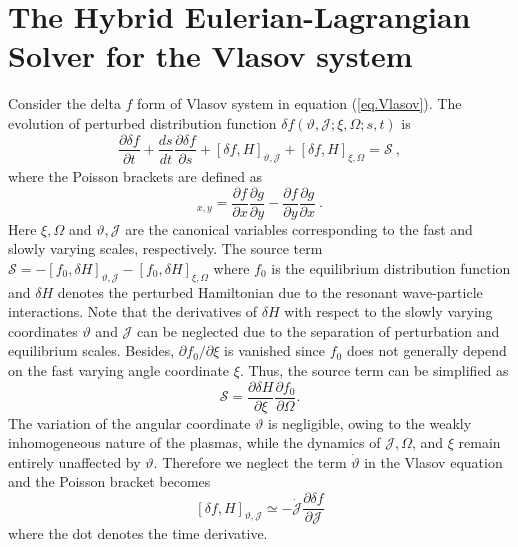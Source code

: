 \section{The Hybrid Eulerian-Lagrangian Solver for the Vlasov system}
\label{sec:vlasov}
Consider the  delta $f$ form of Vlasov system in equation (\ref{eq.Vlasov}). The evolution of  perturbed distribution function $\delta f(\vartheta,\mathcal{J};\xi,\Omega;s,t)$ is
\begin{equation}\label{eq.deltaf}
    \frac{\partial \delta f}{\partial t}+ \frac{d s_{}}{d t} \frac{\partial \delta f}{\partial s_{}} + \left[\delta f, H\right]_{\vartheta,\mathcal{J}} +  \left[\delta f, H\right]_{\xi,\Omega} = \mathcal{S}~,
\end{equation}
where the   Poisson brackets are defined as
\begin{equation}
    [f,~g]_{x,y} = \frac{\partial f}{\partial x}\frac{\partial g}{\partial y}-\frac{\partial f}{\partial y}\frac{\partial g}{\partial x}~.
\end{equation}
Here $\xi,\Omega$ and $\vartheta,\mathcal{J}$ are the canonical variables corresponding to the fast  and slowly varying scales, respectively.
The source term $\mathcal{S}= -\left[f_0, \delta H\right]_{\vartheta, \mathcal{J}} - \left[f_0, \delta H\right]_{\xi, \Omega}$ 
where $f_0$ is the equilibrium distribution function and $\delta H$ denotes the perturbed Hamiltonian due to the resonant wave-particle interactions.
Note that the derivatives of $\delta H$ with respect to the slowly varying coordinates $\vartheta$ and $\mathcal{J}$ can be neglected due to the separation of perturbation and equilibrium scales. Besides, $\partial f_0/\partial \xi$ is vanished since $f_0$ does not generally depend on the fast varying angle coordinate $\xi$.
Thus, the source term can be simplified as 
\begin{equation}
     \mathcal{S} = \frac{\partial \delta H}{\partial \xi}\frac{\partial f_0}{\partial \Omega}.
\end{equation}
The variation of the angular coordinate $\vartheta$ is negligible, owing to the weakly inhomogeneous nature of the plasmas, while the dynamics of $\mathcal{J}, \Omega$, and $\xi$ remain entirely unaffected by $\vartheta$.
Therefore we neglect the term $ \dot{\vartheta} $ in the Vlasov equation and the  Poisson bracket becomes
\begin{equation}
\left[\delta f, H\right]_{\vartheta,\mathcal{J}}\simeq 
 -\dot{\mathcal{J}} \frac{\partial \delta f}{\partial \mathcal{J}}      
\end{equation}
where the dot denotes the time derivative.

